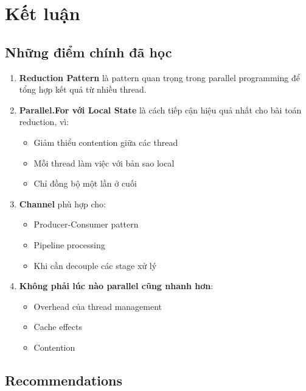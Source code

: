 \documentclass[12pt,a4paper]{article}
\begin{document}
\section{Kết luận}

\subsection{Những điểm chính đã học}

\begin{enumerate}
    \item \textbf{Reduction Pattern} là pattern quan trọng trong parallel programming để tổng hợp kết quả từ nhiều thread.
    
    \item \textbf{Parallel.For với Local State} là cách tiếp cận hiệu quả nhất cho bài toán reduction, vì:
    \begin{itemize}
        \item Giảm thiểu contention giữa các thread
        \item Mỗi thread làm việc với bản sao local
        \item Chỉ đồng bộ một lần ở cuối
    \end{itemize}
    
    \item \textbf{Channel} phù hợp cho:
    \begin{itemize}
        \item Producer-Consumer pattern
        \item Pipeline processing
        \item Khi cần decouple các stage xử lý
    \end{itemize}
    
    \item \textbf{Không phải lúc nào parallel cũng nhanh hơn}:
    \begin{itemize}
        \item Overhead của thread management
        \item Cache effects
        \item Contention
    \end{itemize}
\end{enumerate}

\subsection{Recommendations}
\end{document}
